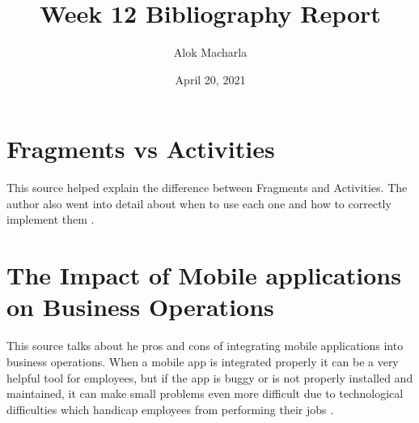 \documentclass{article}
\title{Week 12 Bibliography Report}
\author{Alok Macharla}
\date{April 20, 2021}
\begin{document}
\maketitle

\section{Fragments vs Activities}
This source helped explain the difference between Fragments and Activities. The author also went into detail about when to use each one and how to correctly implement them \cite{servidoni_2017}.

\section{The Impact of Mobile applications on Business Operations}
This source talks about he pros and cons of integrating mobile applications into business operations. When a mobile app is integrated properly it can be a very helpful tool for employees, but if the app is buggy or is not properly installed and maintained, it can make small problems even more difficult due to technological difficulties which handicap employees from performing their jobs \cite{nah2005value}.



\end{document}
